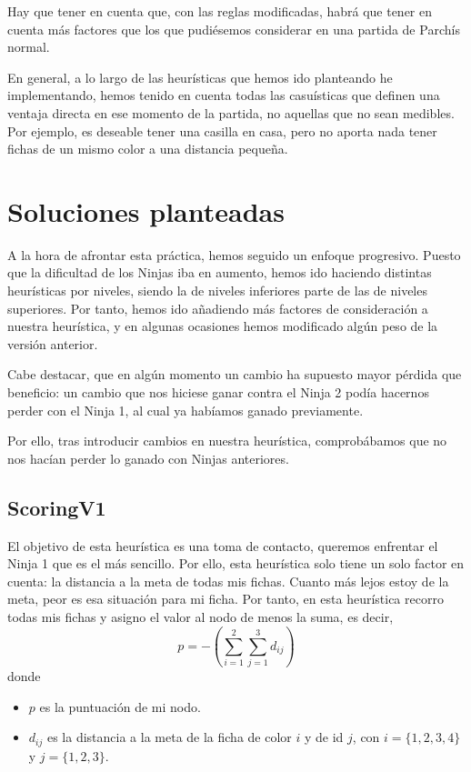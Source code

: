 \documentclass[10pt,a4paper]{article}
\begin{document}
Hay que tener en cuenta que, con las reglas modificadas, habrá que tener en cuenta más factores que los que pudiésemos considerar en una partida de Parchís normal.

En general, a lo largo de las heurísticas que hemos ido planteando he implementando, hemos tenido en cuenta todas las casuísticas que definen una ventaja directa en ese momento de la partida, no aquellas que no sean medibles. Por ejemplo, es deseable tener una casilla en casa, pero no aporta nada tener fichas de un mismo color a una distancia pequeña.

\section{Soluciones planteadas}
A la hora de afrontar esta práctica, hemos seguido un enfoque progresivo. Puesto que la dificultad de los Ninjas iba en aumento, hemos ido haciendo distintas heurísticas por niveles, siendo la de niveles inferiores parte de las de niveles superiores. Por tanto, hemos ido añadiendo más factores de consideración a nuestra heurística, y en algunas ocasiones hemos modificado algún peso de la versión anterior.

Cabe destacar, que en algún momento un cambio ha supuesto mayor pérdida que beneficio: un cambio que nos hiciese ganar contra el Ninja 2 podía hacernos perder con el Ninja 1, al cual ya habíamos ganado previamente. 

Por ello, tras introducir cambios en nuestra heurística, comprobábamos que no nos hacían perder lo ganado con Ninjas anteriores.

\subsection{ScoringV1}
El objetivo de esta heurística es una toma de contacto, queremos enfrentar el Ninja 1 que es el más sencillo. Por ello, esta heurística solo tiene un solo factor en cuenta: la distancia a la meta de todas mis fichas. 
Cuanto más lejos estoy de la meta, peor es esa situación para mi ficha. Por tanto, en esta heurística recorro todas mis fichas y asigno el valor al nodo de menos la suma, es decir, 
\[
	p = - \left(\sum_{i=1}^{2} \sum_{j=1}^{3} d_{ij} \right)
\]
donde
\begin{itemize}
	\item \(p\) es la puntuación de mi nodo.
	\item \(d_{ij}\) es la distancia a la meta de la ficha de color \(i\) y de id \(j\), con \(i = \{1,2,3,4\}\) y \(j = \{1,2,3\}\).
\end{itemize}
\end{document}
